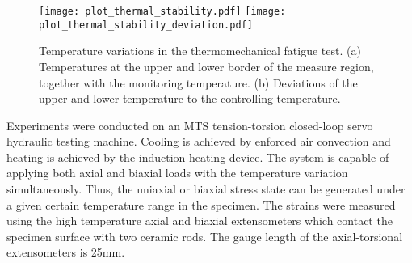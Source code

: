 \documentclass[preprint,5p,twocolumn,11pt,sort&compress]{elsarticle}
\begin{document}
\begin{figure}[!ht]
\texttt{[image: plot\_thermal\_stability.pdf]}
\texttt{[image: plot\_thermal\_stability\_deviation.pdf]}
\caption{Temperature variations in the thermomechanical fatigue test. (a) Temperatures at the upper and lower border of the measure region, together with the monitoring temperature. (b) Deviations of the upper and lower temperature to the controlling temperature.}
\label{Fig:Temp-Distr}
\end{figure}


Experiments were conducted on an MTS tension-torsion closed-loop servo hydraulic testing machine. Cooling is achieved by enforced air convection and heating is achieved by the induction heating device. The system is capable of applying both axial and biaxial loads with the temperature variation simultaneously. Thus, the uniaxial or biaxial stress state can be generated under a given certain temperature range in the specimen. The strains were measured using the high temperature axial and biaxial extensometers which contact the specimen surface with two ceramic rods. The gauge length of the axial-torsional extensometers is 25mm.

\end{document}
